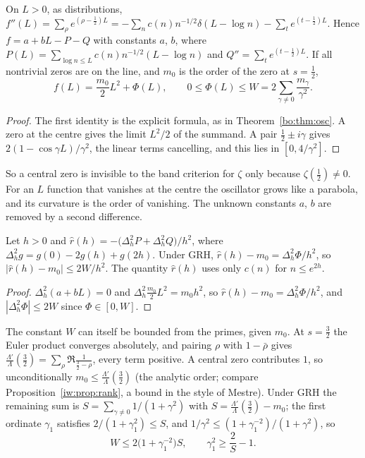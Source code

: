 \begin{theorem}\label{bo:thm:oscL}
On $L>0$, as distributions, $f''(L)=\sum_\rho e^{(\rho-\frac12)L}=-\sum_n c(n)n^{-1/2}\delta(L-\log n)-\sum_te^{(t-\frac12)L}$. Hence $f=a+bL-P-Q$ with constants $a$, $b$, where $P(L)=\sum_{\log n\le L}c(n)n^{-1/2}(L-\log n)$ and $Q''=\sum_te^{(t-\frac12)L}$. If all nontrivial zeros are on the line, and $m_0$ is the order of the zero at $s=\frac12$,
\[
f(L)=\frac{m_0}{2}L^2+\Phi(L),\qquad 0\le\Phi(L)\le W=2\sum_{\gamma\ne0}\frac{m_\gamma}{\gamma^2}.
\]
\end{theorem}

\begin{proof}
The first identity is the explicit formula, as in Theorem~\ref{bo:thm:osc}. A zero at the centre gives the limit $L^2/2$ of the summand. A pair $\frac12\pm i\gamma$ gives $2(1-\cos\gamma L)/\gamma^2$, the linear terms cancelling, and this lies in $[0,4/\gamma^2]$.
\end{proof}

So a central zero is invisible to the band criterion for $\zeta$ only because $\zeta(\frac12)\ne0$. For an $L$ function that vanishes at the centre the oscillator grows like a parabola, and its curvature is the order of vanishing. The unknown constants $a$, $b$ are removed by a second difference.

\begin{corollary}\label{bo:cor:rank}
Let $h>0$ and $\hat r(h)=-\bigl(\Delta_h^2P+\Delta_h^2Q\bigr)/h^2$, where $\Delta_h^2g=g(0)-2g(h)+g(2h)$. Under GRH, $\hat r(h)-m_0=\Delta_h^2\Phi/h^2$, so $|\hat r(h)-m_0|\le2W/h^2$. The quantity $\hat r(h)$ uses only $c(n)$ for $n\le e^{2h}$.
\end{corollary}

\begin{proof}
$\Delta_h^2(a+bL)=0$ and $\Delta_h^2\frac{m_0}{2}L^2=m_0h^2$, so $\hat r(h)-m_0=\Delta_h^2\Phi/h^2$, and $|\Delta_h^2\Phi|\le2W$ since $\Phi\in[0,W]$.
\end{proof}

The constant $W$ can itself be bounded from the primes, given $m_0$. At $s=\frac32$ the Euler product converges absolutely, and pairing $\rho$ with $1-\bar\rho$ gives $\frac{\Lambda'}{\Lambda}(\frac32)=\sum_\rho\Re\frac1{\frac32-\rho}$, every term positive. A central zero contributes $1$, so unconditionally $m_0\le\frac{\Lambda'}{\Lambda}(\frac32)$ (the analytic order; compare Proposition~\ref{iw:prop:rank}, a bound in the style of Mestre). Under GRH the remaining sum is $S=\sum_{\gamma\ne0}1/(1+\gamma^2)$ with $S=\frac{\Lambda'}{\Lambda}(\frac32)-m_0$; the first ordinate $\gamma_1$ satisfies $2/(1+\gamma_1^2)\le S$, and $1/\gamma^2\le(1+\gamma_1^{-2})/(1+\gamma^2)$, so
\[
W\le2\bigl(1+\gamma_1^{-2}\bigr)S,\qquad \gamma_1^2\ge\frac2S-1 .
\]

